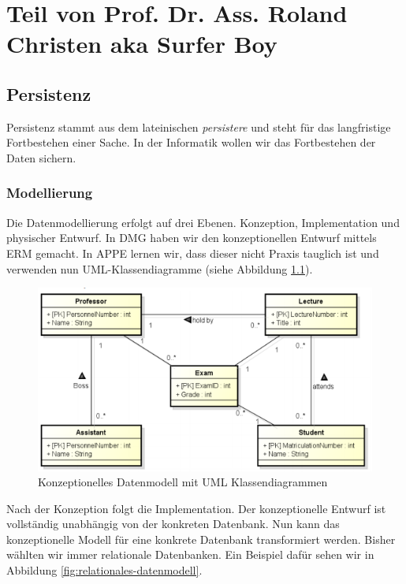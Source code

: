\chapter{Teil von Prof. Dr. Ass. Roland Christen aka Surfer Boy}

\section{Persistenz}
Persistenz stammt aus dem lateinischen \emph{persistere} und steht für das langfristige Fortbestehen einer Sache. In der Informatik wollen wir das Fortbestehen der Daten sichern.

\subsection{Modellierung}
Die Datenmodellierung erfolgt auf drei Ebenen. Konzeption, Implementation und physischer Entwurf. In DMG haben wir den konzeptionellen Entwurf mittels ERM gemacht. In APPE lernen wir, dass dieser nicht Praxis tauglich ist und verwenden nun UML-Klassendiagramme (siehe Abbildung \ref{fig:konzeptionelles-datenmodell-mit-klassendiagram}).
\begin{figure}[h!]
\centering
\includegraphics[width=0.7\linewidth]{fig/konzeptionelles-datenmodell-mit-klassendiagram}
\caption{Konzeptionelles Datenmodell mit UML Klassendiagrammen}
\label{fig:konzeptionelles-datenmodell-mit-klassendiagram}
\end{figure}
Nach der Konzeption folgt die Implementation. Der konzeptionelle Entwurf ist vollständig unabhängig von der konkreten Datenbank. Nun kann das konzeptionelle Modell für eine konkrete Datenbank transformiert werden. Bisher wählten wir immer relationale Datenbanken.
Ein Beispiel dafür sehen wir in Abbildung \ref{fig:relationales-datenmodell}.

